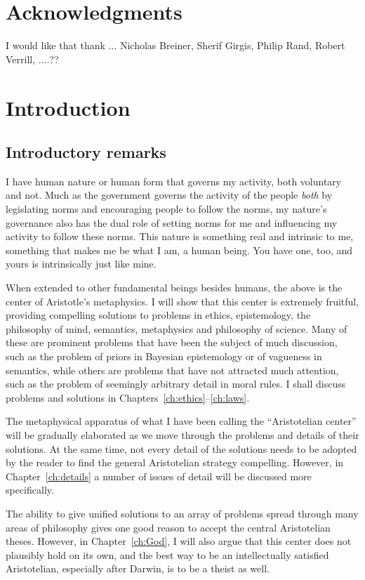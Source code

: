 \def\mychapter{I}

\chapter*{Acknowledgments}
I would like that thank ... Nicholas Breiner, Sherif Girgis, Philip Rand, Robert Verrill, ....??

\chapter{Introduction}\label{ch:intro}
\section{Introductory remarks}
I have human nature or human form that governs my activity, both voluntary and not.
Much as the government governs the activity of the people \textit{both} by legislating norms and encouraging
people to follow the norms, my nature's governance also has the dual role of setting norms for me and influencing my
activity to follow these norms. This nature is something real and intrinsic to me, something that makes me be what I am, 
a human being. You have one, too, and yours is intrinsically just like mine.

When extended to other fundamental beings besides humans, the above is the center of Aristotle's metaphysics.
I will show that this center is extremely fruitful, providing compelling solutions to problems in ethics,
epistemology, the philosophy of mind, semantics, metaphysics and philosophy of science. Many of these are prominent problems that have been
the subject of much discussion, such as the problem of priors in Bayesian epistemology or of vagueness in semantics, while others 
are problems
that have not attracted much attention, such as the problem of seemingly arbitrary detail in moral rules. 
I shall discuss problems and solutions in Chapters~\ref{ch:ethics}--\ref{ch:laws}.

The metaphysical apparatus of what I have been calling the ``Aristotelian center'' will be gradually elaborated
as we move through the problems and details of their solutions. At the same time, not every detail of the solutions needs to be
adopted by the reader to find the general Aristotelian strategy compelling. However, in Chapter~\ref{ch:details} a number of 
issues of detail will be discussed more specifically.

The ability to give unified solutions to an array of problems spread through many areas of philosophy gives one
good reason to accept the central Aristotelian theses. However, in Chapter~\ref{ch:God}, I will also argue that this center does
not plausibly hold on its own, and the best way to be an intellectually satisfied Aristotelian, especially after Darwin, is to be a theist 
as well.

